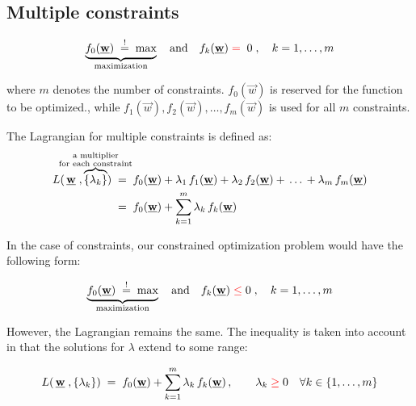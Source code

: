 \subsection{Multiple constraints}

\begin{frame}
 

\slidesonly{\vspace{-2mm}}
    
\begin{equation}
\underbrace{f_0(\vec w) \;\eqexcl\; \text{max}}_{\text{maximization}} \quad  \text{and} \quad f_k(\vec w)\;{\color{red}{=}}\; \; 0 \;, \quad k = 1,\ldots,m
\label{eq:optimizationequalitymultipe}
\end{equation}

where $m$ denotes the number of constraints. $f_{0}(\vec w)$ is reserved for the function to be optimized., while $f_{1}(\vec w), f_{2}(\vec w),\ldots,f_{m}(\vec w)$ is used for all $m$ constraints.

The Lagrangian for multiple constraints is defined as:
\begin{align}
L(\,\vec w\;, \overbrace{\{\lambda_k\}}^{
\mathclap{
\substack{\text{a multiplier} \\
\text{for each constraint}}
}
}) 
\; &= \; 
f_0(\vec w) + \lambda_1 \, f_1(\vec w) + \lambda_2 \, f_2(\vec w) + \, \ldots \, + \lambda_m \, f_m(\vec w) \\
\; &= \; 
f_0(\vec w) + \sum_{k=1}^{m} \lambda_k \, f_k(\vec w)
\label{eq:lagrangianmultiple}
\end{align}


\end{frame}

\begin{frame}

In the case of {\color{red}{inequality}} constraints, our constrained optimization problem would have the following form:

\begin{equation}
\underbrace{f_0(\vec w) \;\eqexcl\; \text{max}}_{\text{maximization}} \quad  \text{and} \quad f_k(\vec w)\; {\color{red}{\le}} \; 0 \;, \quad k = 1,\ldots,m{}
\label{eq:optimizationINequalitymultipe}
\end{equation}

However, the Lagrangian remains the same. The inequality is taken into account in that the solutions for $\lambda$ extend to some range:

\begin{equation}
L(\,\vec w\;, \{\lambda_k\}
) \; = \; f_0(\vec w) + \sum_{k=1}^{m} \lambda_k \, f_k(\vec w)\,,\qquad
\lambda_{k} \;{\color{red}{\ge}}\; 0 \quad \forall k \in \{1,\ldots,m\}
\label{eq:lagrangianINequalitymultiple}
\end{equation}
 
    
\end{frame}
